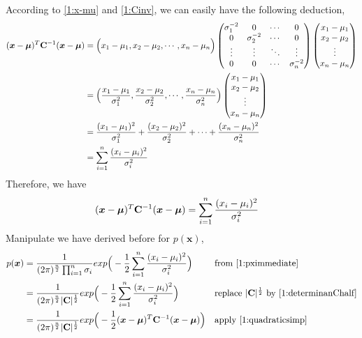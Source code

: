 \documentclass[11pt,a4paper]{article}
\newcommand{\htab}{\hspace*{0.63cm}}
\newcommand{\bmu}{\boldsymbol{\mu}}
\newcommand{\bx}{\boldsymbol{x}}
\newcommand{\half}{\frac{1}{2}}
\begin{document}
\htab According to \eqref{1:x-mu} and \eqref{1:Cinv}, we can easily have the following deduction,
\begin{align}
    (\bx - \bmu)^{T} \C^{-1} (\bx - \bmu) 
    & =
    \Big( x_{1} -\mu_{1} , x_{2} -\mu_{2} , \cdots , x_{n} -\mu_{n} \Big)
    \begin{pmatrix}
        \sigma_{1}^{-2} & 0 & \cdots & 0 \\
        0 & \sigma_{2}^{-2} & \cdots & 0 \\
        \vdots & \vdots & \ddots & \vdots \\
        0 & 0 & \cdots & \sigma_{n}^{-2}
    \end{pmatrix}
    \begin{pmatrix}
        x_{1} -\mu_{1} \\ x_{2} -\mu_{2} \\ \vdots \\ x_{n} -\mu_{n}
        \end{pmatrix} 
    \\ & =
        \Big( \frac{x_{1} -\mu_{1}}{\sigma_{1}^{2}}, \frac{x_{2} -\mu_{2}}{\sigma_{2}^{2}}, \cdots,
         \frac{x_{n} -\mu_{n}}{\sigma_{n}^{2}} \Big)
    \begin{pmatrix}
        x_{1} -\mu_{1} \\ x_{2} -\mu_{2} \\ \vdots \\ x_{n} -\mu_{n}
        \end{pmatrix} 
        \\ & =  \frac{(x_{1} -\mu_{1})^{2}}{\sigma_{1}^{2}} + \frac{(x_{2} -\mu_{2})^{2}}{\sigma_{2}^{2}} + 
        \cdots + \frac{(x_{n} -\mu_{n})^{2}}{\sigma_{n}^{2}} 
        \\ & = \sum_{i = 1}^{n}  \frac{(x_{i} -\mu_{i})^{2}}{\sigma_{i}^{2}}
    \end{align}
\htab Therefore, we have
\begin{align} 
    (\bx - \bmu)^{T} \C^{-1} (\bx - \bmu) &= \sum_{i=1}^{n} \frac{(x_{i} - \mui)^{2}}{\sigmai^{2}}
    \label{1:quadraticsimp}
    \end{align}
\htab Manipulate we have derived before for $p(\bx)$, 
\begin{align}
    p(\bx)    
    & = \frac{1}{(2\pi)^{\frac{n}{2}} \prod_{i=1}^{n}\sigmai}
        exp\Big( - \half \sum_{i=1}^{n} \frac{(x_{i} - \mui)^{2}}{\sigmai^{2}}  \Big) 
        &&\mbox{from \eqref{1:pximmediate}} \\
    & = \frac{1}{(2\pi)^{\frac{n}{2}} |\C|^{\half}} 
        exp\Big( - \half \sum_{i=1}^{n} \frac{(x_{i} - \mui)^{2}}{\sigmai^{2}}  \Big)
        &&\mbox{replace $|\C|^{\half}$ by \eqref{1:determinanChalf}} \\
    & = \frac{1}{(2\pi)^{\frac{n}{2}} |\C|^{\half}} 
        exp\Big( - \half (\bx - \bmu)^{T} \C^{-1} (\bx - \bmu)  \Big)
        &&\mbox{apply \eqref{1:quadraticsimp}} 
    \end{align}
\end{document}
